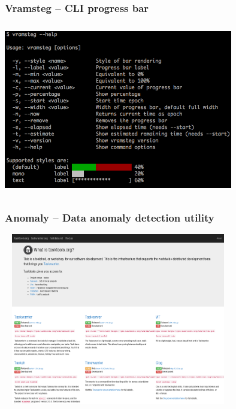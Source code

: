 \documentclass[t,handout]{beamer}
\begin{document}
\begin{frame}\frametitle{Vramsteg -- CLI progress bar}
    \begin{center}
        \href{http://tasktools.org/projects/vramsteg.html}{\includegraphics[width=10cm,height=7.5cm]{vramsteg.png}}
    \end{center}
\end{frame}

\begin{frame}\frametitle{Anomaly -- Data anomaly detection utility}
    \begin{center}
        \href{http://tasktools.org/projects/anomaly.html}{\includegraphics[width=10cm,height=7.5cm]{tasktools-org.png}}
    \end{center}
\end{frame}
\end{document}
